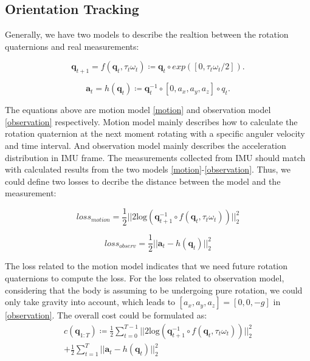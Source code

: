 \documentclass[conference]{IEEEtran}
\begin{document}
\subsection{Orientation Tracking}
Generally, we have two models to describe the realtion between the rotation quaternions and real measurements:

\begin{equation}
    \boldsymbol{q}_{t+1} = f(\boldsymbol{q}_t, \tau_t \omega_t) \coloneq \boldsymbol{q}_t \circ exp([0, \tau_t\omega_t/2]). \label{motion}
\end{equation}

\begin{equation}
    \boldsymbol{a}_t = h(\boldsymbol{q}_t) \coloneq \boldsymbol{q}_t^{-1} \circ [0, a_x, a_y, a_z] \circ q_t. \label{observation}
\end{equation}

The equations above are motion model \eqref{motion} and observation model \eqref{observation} respectively. Motion model mainly
describes how to calculate the rotation quaternion at the next moment rotating with a specific anguler velocity and time interval.
And observation model mainly describes the acceleration distribution in IMU frame. The measurements collected from IMU should match
with calculated results from the two models \eqref{motion}-\eqref{observation}. Thus, we could define two losses to decribe the
distance between the model and the measurement:

\begin{equation}
    loss_{motion} = \frac{1}{2}||2\text{log}(\boldsymbol{q}_{t+1}^{-1} \circ f(\boldsymbol{q}_t, \tau_t \omega_t))||_2^2 \label{lossMotion}
\end{equation}

\begin{equation}
    loss_{observ} = \frac{1}{2} || \boldsymbol{a}_t - h(\boldsymbol{q}_t) ||_2^2
\end{equation}

The loss related to the motion model indicates that we need future rotation quaternions to compute the loss. For the loss related
to observation model, considering that the body is assuming to be undergoing pure rotation, we could only take gravity into account,
which leads to $[a_x, a_y, a_z] = [0, 0, -g]$ in \eqref{observation}. The overall cost could be formulated as:
\begin{equation}
    \begin{aligned}
        c(\boldsymbol{q}_{1:T}) \coloneq \frac{1}{2}\sum\limits_{t=0}^{T-1}||2\text{log}(\boldsymbol{q}_{t+1}^{-1}
        \circ f(\boldsymbol{q}_t, \tau_t \omega_t))||_2^2 \\
        + \frac{1}{2} \sum\limits_{t=1}^{T}|| \boldsymbol{a}_t - h(\boldsymbol{q}_t) ||_2^2
    \end{aligned}
\end{equation}
\end{document}
